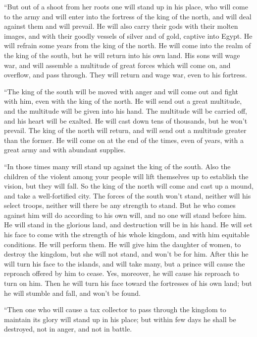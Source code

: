  ``But out of a shoot from her roots one will stand up in
his place, who will come to the army and will enter into the fortress of
the king of the north, and will deal against them and will prevail.
 He will also carry their gods with their molten images, and
with their goodly vessels of silver and of gold, captive into Egypt. He
will refrain some years from the king of the north.  He will
come into the realm of the king of the south, but he will return into
his own land.  His sons will wage war, and will assemble a
multitude of great forces which will come on, and overflow, and pass
through. They will return and wage war, even to his fortress.

 ``The king of the south will be moved with anger and will
come out and fight with him, even with the king of the north. He will
send out a great multitude, and the multitude will be given into his
hand.  The multitude will be carried off, and his heart
will be exalted. He will cast down tens of thousands, but he won't
prevail.  The king of the north will return, and will send
out a multitude greater than the former. He will come on at the end of
the times, even of years, with a great army and with abundant supplies.

 ``In those times many will stand up against the king of
the south. Also the children of the violent among your people will lift
themselves up to establish the vision, but they will fall. 
So the king of the north will come and cast up a mound, and take a
well-fortified city. The forces of the south won't stand, neither will
his select troops, neither will there be any strength to stand.
 But he who comes against him will do according to his own
will, and no one will stand before him. He will stand in the glorious
land, and destruction will be in his hand.  He will set his
face to come with the strength of his whole kingdom, and with him
equitable conditions. He will perform them. He will give him the
daughter of women, to destroy the kingdom, but she will not stand, and
won't be for him.  After this he will turn his face to the
islands, and will take many, but a prince will cause the reproach
offered by him to cease. Yes, moreover, he will cause his reproach to
turn on him.  Then he will turn his face toward the
fortresses of his own land; but he will stumble and fall, and won't be
found.

 ``Then one who will cause a tax collector to pass through
the kingdom to maintain its glory will stand up in his place; but within
few days he shall be destroyed, not in anger, and not in battle.

